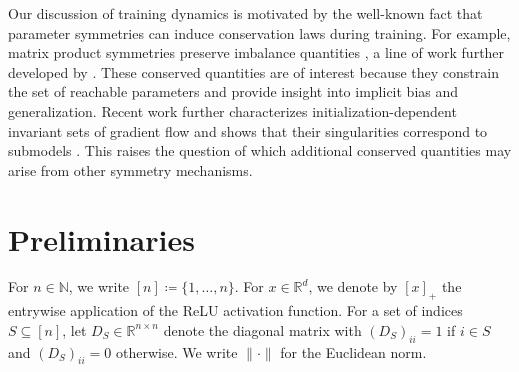 \documentclass{article}
\theoremstyle{definition}
\newcommand{\R}{\mathbb{R}}
\begin{document}
Our discussion of training dynamics is motivated by the well-known fact that parameter symmetries can induce conservation laws during training. 
For example, matrix product symmetries preserve imbalance quantities \citep{tarmoun21understanding,kunin2021neural}, a line of work further developed by \cite{le2022training,marcotte2023abide}. 
%
These conserved quantities are of interest because they constrain the set of reachable parameters and provide insight into implicit bias and generalization. 
%
Recent work further characterizes initialization-dependent invariant sets of gradient flow and shows that their singularities correspond to submodels \citep{nurisso2026topology}. 
This raises the question of which additional conserved quantities may arise from other symmetry mechanisms. 


\section{Preliminaries}

For $n \in \mathbb{N}$, we write $[n] \coloneqq \{1,\dots,n\}$. 
For $x \in \R^d$, we denote by $[x]_+$ the entrywise application of the ReLU activation function. 
For a set of indices $S \subseteq [n]$, let $D_S \in \R^{n\times n}$ denote the diagonal matrix with $(D_S)_{ii}=1$ if $i\in S$ and $(D_S)_{ii}=0$ otherwise. 
We write $\|\cdot\|$ for the Euclidean norm.
\end{document}
